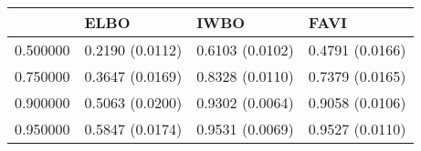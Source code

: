 \begin{tabular}{llll}
\toprule
 & ELBO & IWBO & FAVI \\
\midrule
0.500000 & 0.2190 (0.0112) & 0.6103 (0.0102) & 0.4791 (0.0166) \\
0.750000 & 0.3647 (0.0169) & 0.8328 (0.0110) & 0.7379 (0.0165) \\
0.900000 & 0.5063 (0.0200) & 0.9302 (0.0064) & 0.9058 (0.0106) \\
0.950000 & 0.5847 (0.0174) & 0.9531 (0.0069) & 0.9527 (0.0110) \\
\bottomrule
\end{tabular}
